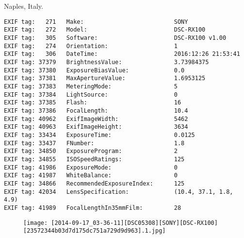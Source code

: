 \section{\protect{}}
\noindent Naples, Italy.
\noindent
\begin{lstlisting}
EXIF tag:   271   Make:                          SONY
EXIF tag:   272   Model:                         DSC-RX100
EXIF tag:   305   Software:                      DSC-RX100 v1.00
EXIF tag:   274   Orientation:                   1
EXIF tag:   306   DateTime:                      2016:12:26 21:53:41
EXIF tag: 37379   BrightnessValue:               3.73984375
EXIF tag: 37380   ExposureBiasValue:             0.0
EXIF tag: 37381   MaxApertureValue:              1.6953125
EXIF tag: 37383   MeteringMode:                  5
EXIF tag: 37384   LightSource:                   0
EXIF tag: 37385   Flash:                         16
EXIF tag: 37386   FocalLength:                   10.4
EXIF tag: 40962   ExifImageWidth:                5462
EXIF tag: 40963   ExifImageHeight:               3634
EXIF tag: 33434   ExposureTime:                  0.0125
EXIF tag: 33437   FNumber:                       1.8
EXIF tag: 34850   ExposureProgram:               2
EXIF tag: 34855   ISOSpeedRatings:               125
EXIF tag: 41986   ExposureMode:                  0
EXIF tag: 41987   WhiteBalance:                  0
EXIF tag: 34866   RecommendedExposureIndex:      125
EXIF tag: 42034   LensSpecification:             (10.4, 37.1, 1.8, 4.9)
EXIF tag: 41989   FocalLengthIn35mmFilm:         28

\end{lstlisting}
\clearpage
\begin{figure}
\raggedleft
\texttt{[image: [2014-09-17\_03-36-11][DSC05308][SONY][DSC-RX100][23572344b03d7d175dc751a729d9d963].1.jpg]}
\end{figure}


\clearpage
